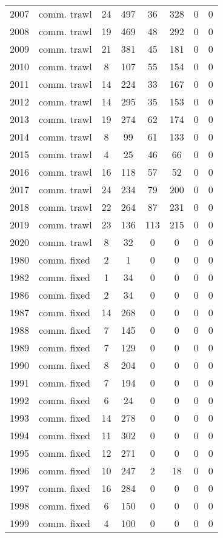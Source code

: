 \begin{longtable}[t]{c>{\centering\arraybackslash}p{2cm}cccccc}
2007 & comm. trawl & 24 & 497 & 36 & 328 & 0 & 0\\
2008 & comm. trawl & 19 & 469 & 48 & 292 & 0 & 0\\
2009 & comm. trawl & 21 & 381 & 45 & 181 & 0 & 0\\
2010 & comm. trawl & 8 & 107 & 55 & 154 & 0 & 0\\
2011 & comm. trawl & 14 & 224 & 33 & 167 & 0 & 0\\
2012 & comm. trawl & 14 & 295 & 35 & 153 & 0 & 0\\
2013 & comm. trawl & 19 & 274 & 62 & 174 & 0 & 0\\
2014 & comm. trawl & 8 & 99 & 61 & 133 & 0 & 0\\
2015 & comm. trawl & 4 & 25 & 46 & 66 & 0 & 0\\
2016 & comm. trawl & 16 & 118 & 57 & 52 & 0 & 0\\
2017 & comm. trawl & 24 & 234 & 79 & 200 & 0 & 0\\
2018 & comm. trawl & 22 & 264 & 87 & 231 & 0 & 0\\
2019 & comm. trawl & 23 & 136 & 113 & 215 & 0 & 0\\
2020 & comm. trawl & 8 & 32 & 0 & 0 & 0 & 0\\
1980 & comm. fixed & 2 & 1 & 0 & 0 & 0 & 0\\
1982 & comm. fixed & 1 & 34 & 0 & 0 & 0 & 0\\
1986 & comm. fixed & 2 & 34 & 0 & 0 & 0 & 0\\
1987 & comm. fixed & 14 & 268 & 0 & 0 & 0 & 0\\
1988 & comm. fixed & 7 & 145 & 0 & 0 & 0 & 0\\
1989 & comm. fixed & 7 & 129 & 0 & 0 & 0 & 0\\
1990 & comm. fixed & 8 & 204 & 0 & 0 & 0 & 0\\
1991 & comm. fixed & 7 & 194 & 0 & 0 & 0 & 0\\
1992 & comm. fixed & 6 & 24 & 0 & 0 & 0 & 0\\
1993 & comm. fixed & 14 & 278 & 0 & 0 & 0 & 0\\
1994 & comm. fixed & 11 & 302 & 0 & 0 & 0 & 0\\
1995 & comm. fixed & 12 & 271 & 0 & 0 & 0 & 0\\
1996 & comm. fixed & 10 & 247 & 2 & 18 & 0 & 0\\
1997 & comm. fixed & 16 & 284 & 0 & 0 & 0 & 0\\
1998 & comm. fixed & 6 & 150 & 0 & 0 & 0 & 0\\
1999 & comm. fixed & 4 & 100 & 0 & 0 & 0 & 0\\

\end{longtable}
